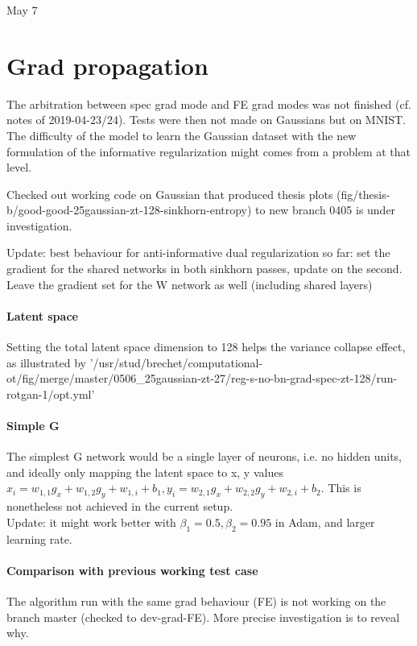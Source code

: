 \documentclass[11pt,a4paper]{article}
\begin{document}

{\Huge May  7}

\section*{Grad propagation}

The arbitration between spec grad mode and FE grad modes was not finished (cf.
notes of 2019-04-23/24). Tests were then not made on Gaussians but on MNIST. The difficulty of
the model to learn the Gaussian dataset with the new formulation of the
informative regularization might comes from a problem at that level.

Checked out working code on Gaussian that produced thesis plots
(fig/thesis-b/good-good-25gaussian-zt-128-sinkhorn-entropy) to new branch 0405 is under
investigation.

Update: best behaviour for anti-informative dual regularization so far: set the
gradient for the shared networks in both sinkhorn passes, update on the second.
Leave the gradient set for the W network as well (including shared layers)

\paragraph{Latent space} Setting the total latent space dimension to 128 helps the variance collapse effect, as illustrated by '/usr/stud/brechet/computational-ot/fig/merge/master/0506_25gaussian-zt-27/reg-s-no-bn-grad-spec-zt-128/run-rotgan-1/opt.yml'

\paragraph{Simple G} The simplest G network would be a single layer of neurons,
i.e. no hidden units, and ideally only mapping the latent space to x, y values
$x_i = w_{1, 1} g_x + w_{1, 2} g_y + w_{1, i} + b_{1}, y_i = w_{2,1} g_x +
w_{2, 2} g_y + w_{2, i} +  b_{2}$. This is nonetheless not achieved in the
current setup. \\

Update: it might work better with $\beta_1 = 0.5, \beta_2 = 0.95$ in Adam, and larger learning rate.

\paragraph{Comparison with previous working test case} The algorithm run with the same grad behaviour (FE) is not working on the branch master (checked to dev-grad-FE). More precise investigation is to reveal why.
\end{document}
